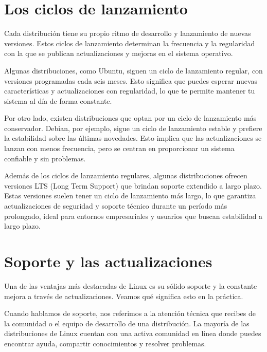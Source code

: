 \documentclass[
  letterpaper,
  DIV=11,
  numbers=noendperiod]{scrartcl}
\begin{document}
\hypertarget{los-ciclos-de-lanzamiento}{%
\section{Los ciclos de lanzamiento}\label{los-ciclos-de-lanzamiento}}

Cada distribución tiene su propio ritmo de desarrollo y lanzamiento de
nuevas versiones. Estos ciclos de lanzamiento determinan la frecuencia y
la regularidad con la que se publican actualizaciones y mejoras en el
sistema operativo.

Algunas distribuciones, como Ubuntu, siguen un ciclo de lanzamiento
regular, con versiones programadas cada seis meses. Esto significa que
puedes esperar nuevas características y actualizaciones con regularidad,
lo que te permite mantener tu sistema al día de forma constante.

Por otro lado, existen distribuciones que optan por un ciclo de
lanzamiento más conservador. Debian, por ejemplo, sigue un ciclo de
lanzamiento estable y prefiere la estabilidad sobre las últimas
novedades. Esto implica que las actualizaciones se lanzan con menos
frecuencia, pero se centran en proporcionar un sistema confiable y sin
problemas.

Además de los ciclos de lanzamiento regulares, algunas distribuciones
ofrecen versiones LTS (Long Term Support) que brindan soporte extendido
a largo plazo. Estas versiones suelen tener un ciclo de lanzamiento más
largo, lo que garantiza actualizaciones de seguridad y soporte técnico
durante un período más prolongado, ideal para entornos empresariales y
usuarios que buscan estabilidad a largo plazo.

\hypertarget{soporte-y-las-actualizaciones}{%
\section{Soporte y las
actualizaciones}\label{soporte-y-las-actualizaciones}}

Una de las ventajas más destacadas de Linux es su sólido soporte y la
constante mejora a través de actualizaciones. Veamos qué significa esto
en la práctica.

Cuando hablamos de soporte, nos referimos a la atención técnica que
recibes de la comunidad o el equipo de desarrollo de una distribución.
La mayoría de las distribuciones de Linux cuentan con una activa
comunidad en línea donde puedes encontrar ayuda, compartir conocimientos
y resolver problemas.
\end{document}

